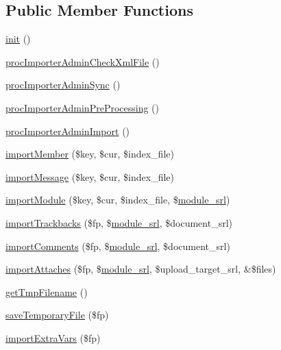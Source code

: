 \subsection*{Public Member Functions}
\begin{DoxyCompactItemize}
\item 
\hyperlink{classimporterAdminController_a5b0172b0077de7de8b718b897b9fb562}{init} ()
\item 
\hyperlink{classimporterAdminController_aa553a8db633713f858c1064a5b8fa621}{proc\-Importer\-Admin\-Check\-Xml\-File} ()
\item 
\hyperlink{classimporterAdminController_a979a756ae2a180270e08f72536c85d74}{proc\-Importer\-Admin\-Sync} ()
\item 
\hyperlink{classimporterAdminController_a112303ff9925d381a27f526b97909205}{proc\-Importer\-Admin\-Pre\-Processing} ()
\item 
\hyperlink{classimporterAdminController_a51a0e3d1bccf3f7c539b119bf394d572}{proc\-Importer\-Admin\-Import} ()
\item 
\hyperlink{classimporterAdminController_a34c3708a45075ca44f1c1e274c5e002d}{import\-Member} (\$key, \$cur, \$index\-\_\-file)
\item 
\hyperlink{classimporterAdminController_a604522c32bf020d51c1c6d868969cf7e}{import\-Message} (\$key, \$cur, \$index\-\_\-file)
\item 
\hyperlink{classimporterAdminController_a7609f3f95b4c1e10be65dfcec57d0d27}{import\-Module} (\$key, \$cur, \$index\-\_\-file, \$\hyperlink{ko_8install_8php_a370bb6450fab1da3e0ed9f484a38b761}{module\-\_\-srl})
\item 
\hyperlink{classimporterAdminController_a9f2397ca84ef0adb182cf2b63b941604}{import\-Trackbacks} (\$fp, \$\hyperlink{ko_8install_8php_a370bb6450fab1da3e0ed9f484a38b761}{module\-\_\-srl}, \$document\-\_\-srl)
\item 
\hyperlink{classimporterAdminController_a5a83e9fecd854dd75464d6f4cd63f344}{import\-Comments} (\$fp, \$\hyperlink{ko_8install_8php_a370bb6450fab1da3e0ed9f484a38b761}{module\-\_\-srl}, \$document\-\_\-srl)
\item 
\hyperlink{classimporterAdminController_a259bb7d8ae0b653dc45e544af3100753}{import\-Attaches} (\$fp, \$\hyperlink{ko_8install_8php_a370bb6450fab1da3e0ed9f484a38b761}{module\-\_\-srl}, \$upload\-\_\-target\-\_\-srl, \&\$files)
\item 
\hyperlink{classimporterAdminController_a007ae310ca94fb49d96bcdfa3688cb6d}{get\-Tmp\-Filename} ()
\item 
\hyperlink{classimporterAdminController_af263aba79294e35c2027b2e41ac2a198}{save\-Temporary\-File} (\$fp)
\item 
\hyperlink{classimporterAdminController_afa354c44da369a7d71f8d7556632705f}{import\-Extra\-Vars} (\$fp)
\end{DoxyCompactItemize}
